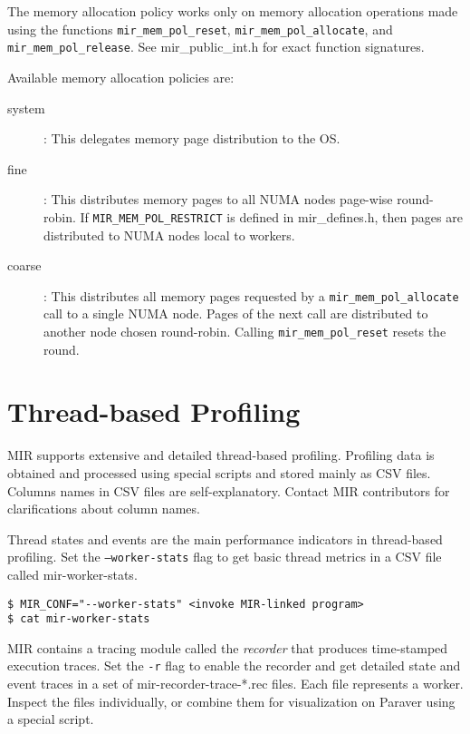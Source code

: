 \documentclass[11pt,a4paper]{article}
\begin{document}
The memory allocation policy works only on memory allocation operations made using the functions \texttt{mir\_mem\_pol\_reset}, \texttt{mir\_mem\_pol\_allocate}, and \texttt{mir\_mem\_pol\_release}. See \textsf{mir\_public\_int.h} for exact function signatures.

Available memory allocation policies are:
\begin{description}
    \item[system]: This delegates memory page distribution to the OS.
    \item[fine]: This distributes memory pages to all NUMA nodes page-wise round-robin. If \texttt{MIR\_MEM\_POL\_RESTRICT} is defined in \textsf{mir\_defines.h}, then pages are distributed to NUMA nodes local to workers.
    \item[coarse]: This distributes all memory pages requested by a \texttt{mir\_mem\_pol\_allocate} call to a single NUMA node. Pages of the next call are distributed to another node chosen round-robin. Calling \texttt{mir\_mem\_pol\_reset} resets the round.
\end{description}

\section{Thread-based Profiling}\label{sec:thread-based-profiling}

MIR supports extensive and detailed thread-based profiling. Profiling data is obtained and processed using special scripts and stored mainly as CSV files. Columns names in CSV files are self-explanatory. Contact MIR contributors for clarifications about column names.

Thread states and events are the main performance indicators in thread-based profiling.
Set the \texttt{--worker-stats} flag to get basic thread metrics in a CSV file called \textsf{mir-worker-stats}.

\begin{lstlisting}[style=MyInputStyle]
$ MIR_CONF="--worker-stats" <invoke MIR-linked program>
$ cat mir-worker-stats
\end{lstlisting}

MIR contains a tracing module called the \textit{recorder} that produces time-stamped execution traces. Set the \texttt{-r} flag to enable the recorder and get detailed state and event traces in a set of \textsf{mir-recorder-trace-*.rec} files.  Each file represents a worker. Inspect the files individually, or combine them for visualization on Paraver using a special script.
\end{document}
